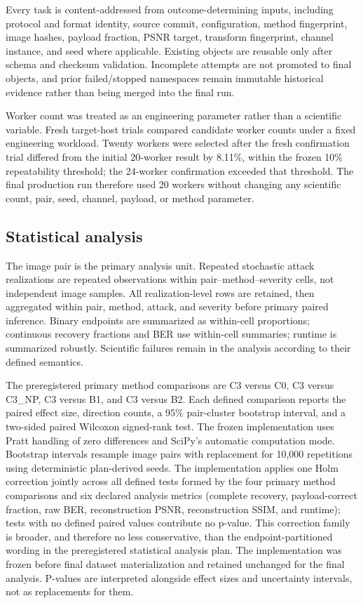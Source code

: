 Every task is content-addressed from outcome-determining inputs, including protocol and format identity, source commit, configuration, method fingerprint, image hashes, payload fraction, PSNR target, transform fingerprint, channel instance, and seed where applicable. Existing objects are reusable only after schema and checksum validation. Incomplete attempts are not promoted to final objects, and prior failed/stopped namespaces remain immutable historical evidence rather than being merged into the final run.

Worker count was treated as an engineering parameter rather than a scientific variable. Fresh target-host trials compared candidate worker counts under a fixed engineering workload. Twenty workers were selected after the fresh confirmation trial differed from the initial 20-worker result by 8.11\%, within the frozen 10\% repeatability threshold; the 24-worker confirmation exceeded that threshold. The final production run therefore used 20 workers without changing any scientific count, pair, seed, channel, payload, or method parameter.

\subsection{Statistical analysis}

The image pair is the primary analysis unit. Repeated stochastic attack realizations are repeated observations within pair--method--severity cells, not independent image samples. All realization-level rows are retained, then aggregated within pair, method, attack, and severity before primary paired inference. Binary endpoints are summarized as within-cell proportions; continuous recovery fractions and BER use within-cell summaries; runtime is summarized robustly. Scientific failures remain in the analysis according to their defined semantics.

The preregistered primary method comparisons are C3 versus C0, C3 versus C3\_NP, C3 versus B1, and C3 versus B2. Each defined comparison reports the paired effect size, direction counts, a 95\% pair-cluster bootstrap interval, and a two-sided paired Wilcoxon signed-rank test. The frozen implementation uses Pratt handling of zero differences and SciPy's automatic computation mode. Bootstrap intervals resample image pairs with replacement for 10,000 repetitions using deterministic plan-derived seeds. The implementation applies one Holm correction jointly across all defined tests formed by the four primary method comparisons and six declared analysis metrics (complete recovery, payload-correct fraction, raw BER, reconstruction PSNR, reconstruction SSIM, and runtime); tests with no defined paired values contribute no p-value. This correction family is broader, and therefore no less conservative, than the endpoint-partitioned wording in the preregistered statistical analysis plan. The implementation was frozen before final dataset materialization and retained unchanged for the final analysis. P-values are interpreted alongside effect sizes and uncertainty intervals, not as replacements for them.

